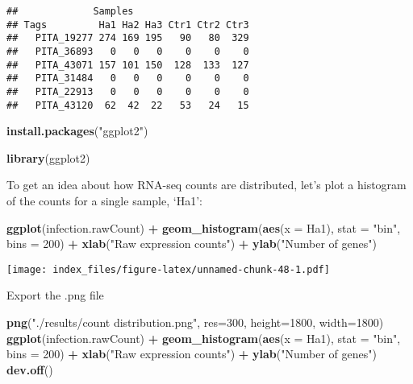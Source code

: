 \documentclass[
]{article}
\newenvironment{Shaded}{\begin{snugshade}}{\end{snugshade}}
\newcommand{\AttributeTok}[1]{\textcolor[rgb]{0.13,0.29,0.53}{#1}}
\newcommand{\DecValTok}[1]{\textcolor[rgb]{0.00,0.00,0.81}{#1}}
\newcommand{\FunctionTok}[1]{\textcolor[rgb]{0.13,0.29,0.53}{\textbf{#1}}}
\newcommand{\NormalTok}[1]{#1}
\newcommand{\SpecialCharTok}[1]{\textcolor[rgb]{0.81,0.36,0.00}{\textbf{#1}}}
\newcommand{\StringTok}[1]{\textcolor[rgb]{0.31,0.60,0.02}{#1}}
\begin{document}
\begin{verbatim}
##             Samples
## Tags         Ha1 Ha2 Ha3 Ctr1 Ctr2 Ctr3
##   PITA_19277 274 169 195   90   80  329
##   PITA_36893   0   0   0    0    0    0
##   PITA_43071 157 101 150  128  133  127
##   PITA_31484   0   0   0    0    0    0
##   PITA_22913   0   0   0    0    0    0
##   PITA_43120  62  42  22   53   24   15
\end{verbatim}

\begin{Shaded}
\begin{Highlighting}[]
\FunctionTok{install.packages}\NormalTok{(}\StringTok{"ggplot2"}\NormalTok{)}
\end{Highlighting}
\end{Shaded}

\begin{Shaded}
\begin{Highlighting}[]
\FunctionTok{library}\NormalTok{(ggplot2)}
\end{Highlighting}
\end{Shaded}

To get an idea about how RNA-seq counts are distributed, let's plot a
histogram of the counts for a single sample, `Ha1':

\begin{Shaded}
\begin{Highlighting}[]
\FunctionTok{ggplot}\NormalTok{(infection.rawCount) }\SpecialCharTok{+}
  \FunctionTok{geom\_histogram}\NormalTok{(}\FunctionTok{aes}\NormalTok{(}\AttributeTok{x =}\NormalTok{ Ha1), }\AttributeTok{stat =} \StringTok{"bin"}\NormalTok{, }\AttributeTok{bins =} \DecValTok{200}\NormalTok{) }\SpecialCharTok{+}
  \FunctionTok{xlab}\NormalTok{(}\StringTok{"Raw expression counts"}\NormalTok{) }\SpecialCharTok{+}
  \FunctionTok{ylab}\NormalTok{(}\StringTok{"Number of genes"}\NormalTok{)}
\end{Highlighting}
\end{Shaded}

\texttt{[image: index\_files/figure-latex/unnamed-chunk-48-1.pdf]}

Export the .png file

\begin{Shaded}
\begin{Highlighting}[]
\FunctionTok{png}\NormalTok{(}\StringTok{"./results/count distribution.png"}\NormalTok{, }\AttributeTok{res=}\DecValTok{300}\NormalTok{, }\AttributeTok{height=}\DecValTok{1800}\NormalTok{, }\AttributeTok{width=}\DecValTok{1800}\NormalTok{)}
\FunctionTok{ggplot}\NormalTok{(infection.rawCount) }\SpecialCharTok{+}
  \FunctionTok{geom\_histogram}\NormalTok{(}\FunctionTok{aes}\NormalTok{(}\AttributeTok{x =}\NormalTok{ Ha1), }\AttributeTok{stat =} \StringTok{"bin"}\NormalTok{, }\AttributeTok{bins =} \DecValTok{200}\NormalTok{) }\SpecialCharTok{+}
  \FunctionTok{xlab}\NormalTok{(}\StringTok{"Raw expression counts"}\NormalTok{) }\SpecialCharTok{+}
  \FunctionTok{ylab}\NormalTok{(}\StringTok{"Number of genes"}\NormalTok{)}
\FunctionTok{dev.off}\NormalTok{()}
\end{Highlighting}
\end{Shaded}
\end{document}
